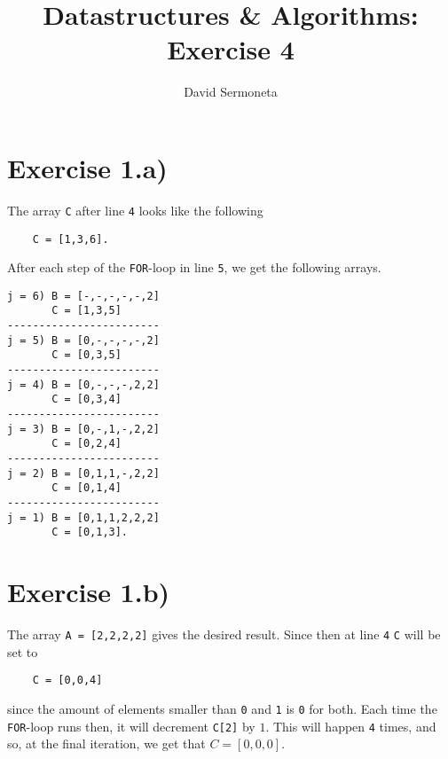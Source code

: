 \documentclass{article}
\title{Datastructures \& Algorithms: Exercise 4}
\author{David Sermoneta}
\begin{document}
\maketitle
\section*{Exercise 1.a)}
The array \texttt{C} after line  \texttt{4} looks like the following 
\begin{lstlisting}
    C = [1,3,6].
\end{lstlisting}
After each step of the \texttt{FOR}-loop in line  \texttt{5}, we get the 
following arrays.
\begin{lstlisting}
j = 6) B = [-,-,-,-,-,2]
       C = [1,3,5]
------------------------
j = 5) B = [0,-,-,-,-,2]
       C = [0,3,5]
------------------------
j = 4) B = [0,-,-,-,2,2]
       C = [0,3,4]
------------------------
j = 3) B = [0,-,1,-,2,2]
       C = [0,2,4]
------------------------
j = 2) B = [0,1,1,-,2,2]
       C = [0,1,4]
------------------------
j = 1) B = [0,1,1,2,2,2]
       C = [0,1,3].
\end{lstlisting}

\section*{Exercise 1.b)}
The array  \texttt{A = [2,2,2,2]} gives the desired result. Since then 
at line  \texttt{4}  \texttt{C} will be set to 
\begin{lstlisting}
    C = [0,0,4]
\end{lstlisting}
since the amount of elements smaller than \texttt{0} and  \texttt{1} 
is \texttt{0} for both. 
Each time the \texttt{FOR}-loop runs then, it will decrement \texttt{C[2]}
by $1$. This will happen \texttt{4} times, and so, at the final iteration,
we get that $C = [0,0,0]$.
\end{document}
